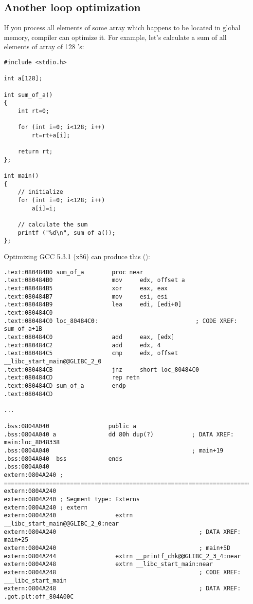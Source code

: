 \subsection{Another loop optimization}

If you process all elements of some array which happens to be located in global memory, compiler can optimize it.
For example, let's calculate a sum of all elements of array of 128 's:

\begin{lstlisting}
#include <stdio.h>

int a[128];

int sum_of_a()
{
	int rt=0;
	
	for (int i=0; i<128; i++)
		rt=rt+a[i];

	return rt;
};

int main()
{
	// initialize
	for (int i=0; i<128; i++)
		a[i]=i;
	
	// calculate the sum
	printf ("%d\n", sum_of_a());
};
\end{lstlisting}

Optimizing GCC 5.3.1 (x86) can produce this (\IDA):

\begin{lstlisting}
.text:080484B0 sum_of_a        proc near
.text:080484B0                 mov     edx, offset a
.text:080484B5                 xor     eax, eax
.text:080484B7                 mov     esi, esi
.text:080484B9                 lea     edi, [edi+0]
.text:080484C0
.text:080484C0 loc_80484C0:                            ; CODE XREF: sum_of_a+1B
.text:080484C0                 add     eax, [edx]
.text:080484C2                 add     edx, 4
.text:080484C5                 cmp     edx, offset __libc_start_main@@GLIBC_2_0
.text:080484CB                 jnz     short loc_80484C0
.text:080484CD                 rep retn
.text:080484CD sum_of_a        endp
.text:080484CD

...

.bss:0804A040                 public a
.bss:0804A040 a               dd 80h dup(?)           ; DATA XREF: main:loc_8048338
.bss:0804A040                                         ; main+19
.bss:0804A040 _bss            ends
.bss:0804A040
extern:0804A240 ; ===========================================================================
extern:0804A240
extern:0804A240 ; Segment type: Externs
extern:0804A240 ; extern
extern:0804A240                 extrn __libc_start_main@@GLIBC_2_0:near
extern:0804A240                                         ; DATA XREF: main+25
extern:0804A240                                         ; main+5D
extern:0804A244                 extrn __printf_chk@@GLIBC_2_3_4:near
extern:0804A248                 extrn __libc_start_main:near
extern:0804A248                                         ; CODE XREF: ___libc_start_main
extern:0804A248                                         ; DATA XREF: .got.plt:off_804A00C
\end{lstlisting}

